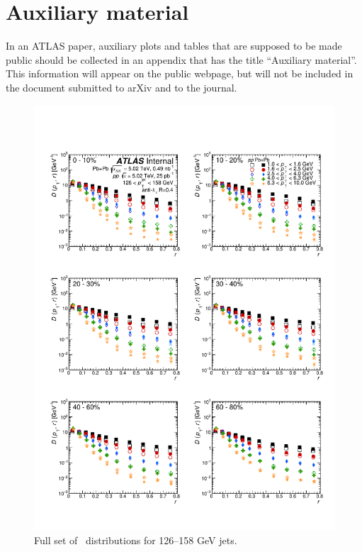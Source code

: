 
\part*{Auxiliary material}

In an ATLAS paper, auxiliary plots and tables that are supposed to be made public 
should be collected in an appendix that has the title \enquote{Auxiliary material}.
This information will appear on the public webpage, but will not be included
in the document submitted to arXiv and to the journal.


\begin{figure}[h]
\includegraphics[width=1.0\textwidth]{figures/results/DpT_dR_jet7.pdf}
\caption{Full set of \Dptr\ distributions for 126--158 GeV jets.}
\label{fig:fullset_dptr_j7}
\end{figure}

